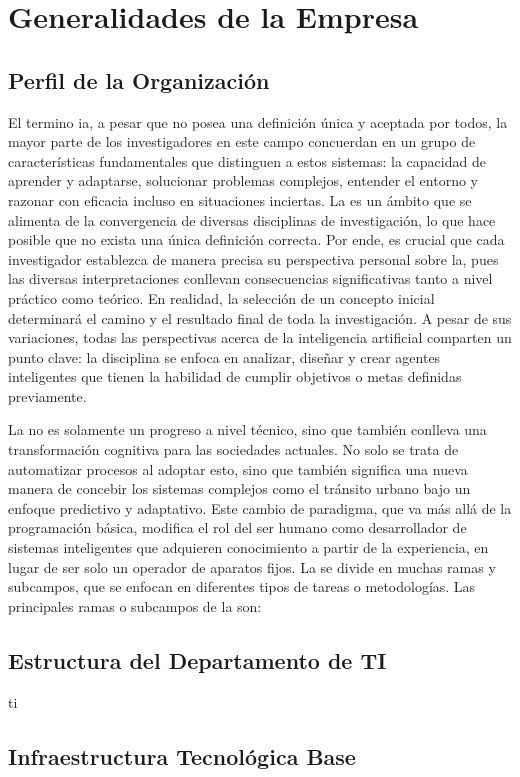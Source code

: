 \chapter{Generalidades de la Empresa}\label{cp:inteligencia-artificial}

\section{Perfil de la Organización}\label{sec:concepto-ramas-IA}
El termino \gls{ia}, a pesar que no posea una definición única y aceptada por todos, la mayor parte de los 
investigadores en este campo concuerdan en un grupo de características fundamentales que distinguen a 
estos sistemas: la capacidad de aprender y adaptarse, solucionar problemas complejos, entender el entorno 
y razonar con eficacia incluso en situaciones inciertas. La  es un ámbito que se alimenta de la 
convergencia de diversas disciplinas de investigación, lo que hace posible que no exista una única 
definición correcta.  Por ende, es crucial que cada investigador establezca de manera precisa su 
perspectiva personal sobre la, pues las diversas interpretaciones conllevan consecuencias 
significativas tanto a nivel práctico como teórico.  En realidad, la selección de un concepto inicial 
determinará el camino y el resultado final de toda la investigación. A pesar de 
sus variaciones, todas las perspectivas acerca de la inteligencia artificial comparten un punto clave: la 
disciplina se enfoca en analizar, diseñar y crear agentes inteligentes que tienen la habilidad de cumplir 
objetivos o metas definidas previamente.

La no es solamente un progreso a nivel técnico, sino que también conlleva una transformación cognitiva 
para las sociedades actuales. No solo se trata de automatizar procesos al adoptar esto, sino que también 
significa una nueva manera de concebir los sistemas complejos como el tránsito urbano bajo un enfoque 
predictivo y adaptativo. Este cambio de paradigma, que va más allá de la programación básica, modifica el 
rol del ser humano como desarrollador de sistemas inteligentes que adquieren conocimiento a partir de la 
experiencia, en lugar de ser solo un operador de aparatos fijos.
La se divide en muchas ramas y subcampos, que se enfocan en diferentes tipos de tareas o metodologías. 
Las principales ramas o subcampos de la son:

\section{Estructura del Departamento de TI}\label{sec:departamento-ti}
\gls{ti}

\section{Infraestructura Tecnológica Base}
